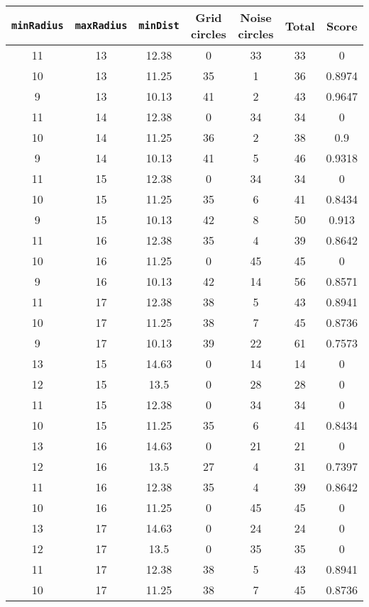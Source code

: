 \documentclass[letterpaper, 12pt]{article}
\begin{document}
\begin{longtable}{|c|c|c|c|c|c|c|}
\hline
\textbf{\texttt{minRadius}} & \textbf{\texttt{maxRadius}} & \textbf{\texttt{minDist}} & \textbf{Grid circles} & \textbf{Noise circles} & \textbf{Total} & \textbf{Score} \\
\hline
11 & 13 & 12.38 & 0 & 33 & 33 & 0 \\
\hline
10 & 13 & 11.25 & 35 & 1 & 36 & 0.8974 \\
\hline
9 & 13 & 10.13 & 41 & 2 & 43 & 0.9647 \\
\hline
11 & 14 & 12.38 & 0 & 34 & 34 & 0 \\
\hline
10 & 14 & 11.25 & 36 & 2 & 38 & 0.9 \\
\hline
9 & 14 & 10.13 & 41 & 5 & 46 & 0.9318 \\
\hline
11 & 15 & 12.38 & 0 & 34 & 34 & 0 \\
\hline
10 & 15 & 11.25 & 35 & 6 & 41 & 0.8434 \\
\hline
9 & 15 & 10.13 & 42 & 8 & 50 & 0.913 \\
\hline
11 & 16 & 12.38 & 35 & 4 & 39 & 0.8642 \\
\hline
10 & 16 & 11.25 & 0 & 45 & 45 & 0 \\
\hline
9 & 16 & 10.13 & 42 & 14 & 56 & 0.8571 \\
\hline
11 & 17 & 12.38 & 38 & 5 & 43 & 0.8941 \\
\hline
10 & 17 & 11.25 & 38 & 7 & 45 & 0.8736 \\
\hline
9 & 17 & 10.13 & 39 & 22 & 61 & 0.7573 \\
\hline
13 & 15 & 14.63 & 0 & 14 & 14 & 0 \\
\hline
12 & 15 & 13.5 & 0 & 28 & 28 & 0 \\
\hline
11 & 15 & 12.38 & 0 & 34 & 34 & 0 \\
\hline
10 & 15 & 11.25 & 35 & 6 & 41 & 0.8434 \\
\hline
13 & 16 & 14.63 & 0 & 21 & 21 & 0 \\
\hline
12 & 16 & 13.5 & 27 & 4 & 31 & 0.7397 \\
\hline
11 & 16 & 12.38 & 35 & 4 & 39 & 0.8642 \\
\hline
10 & 16 & 11.25 & 0 & 45 & 45 & 0 \\
\hline
13 & 17 & 14.63 & 0 & 24 & 24 & 0 \\
\hline
12 & 17 & 13.5 & 0 & 35 & 35 & 0 \\
\hline
11 & 17 & 12.38 & 38 & 5 & 43 & 0.8941 \\
\hline
10 & 17 & 11.25 & 38 & 7 & 45 & 0.8736 \\

\end{longtable}
\end{document}
